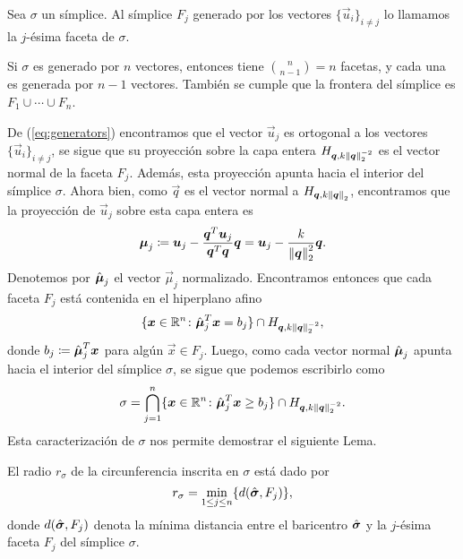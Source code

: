 \begin{definition}
	Sea $\sigma$ un símplice. Al símplice $F_j$ generado por los vectores $\lbrace \vec{u}_i
	\rbrace_{i \neq j}$ lo llamamos la $j$-ésima faceta de $\sigma$.
\end{definition}
\begin{observation}
	Si $\sigma$ es generado por $n$ vectores, entonces tiene $\binom{n}{n-1} = n$ facetas, y cada
	una es generada por $n - 1$ vectores. También se cumple que la frontera del símplice es $F_1
	\cup \cdots \cup F_n$.
\end{observation}

De (\ref{eq:generators}) encontramos que el vector $\vec{u}_j$ es ortogonal a los vectores $\lbrace
\vec{u}_i \rbrace_{i \neq j}$, se sigue que su proyección sobre la capa entera $H_{\boldsymbol{q},
k\left\lVert \boldsymbol{q} \right\rVert_2^{-2}}$ es el vector normal de la faceta $F_j$. Además, esta proyección apunta
hacia el interior del símplice $\sigma$. Ahora bien, como $\vec{q}$ es el vector normal a
$H_{\boldsymbol{q}, k\left\lVert \boldsymbol{q} \right\rVert_2}$, encontramos que la proyección de $\vec{u}_j$ sobre esta capa
entera es
\begin{equation}
	\label{eq:normal-vector}
	\boldsymbol{\mu}_j \coloneq
	\boldsymbol{u}_j - \frac{\boldsymbol{q}^T\boldsymbol{u}_j}{\boldsymbol{q}^T\boldsymbol{q}}\boldsymbol{q}
	=
	\boldsymbol{u}_j - \frac{k}{\left\lVert \boldsymbol{q} \right\rVert_2^2}\boldsymbol{q}.
\end{equation}
Denotemos por $\hat{\boldsymbol{ \mu }}_j$ el vector $\vec{\mu}_j$ normalizado. Encontramos entonces que cada
faceta $F_j$ está contenida en el hiperplano afino
\begin{equation*}
	\lbrace \boldsymbol{x} \in \mathbb{R}^{n} \colon \hat{\boldsymbol{ \mu }}_j^T\boldsymbol{x} = b_j \rbrace
	\cap H_{\boldsymbol{q}, k\left\lVert \boldsymbol{q} \right\rVert_2^{-2}},
\end{equation*}
donde $b_j \coloneq \hat{\boldsymbol{ \mu }}_j^T\boldsymbol{x}$ para algún $\vec{x} \in F_j$. Luego, como cada
vector normal $\hat{\boldsymbol{ \mu }}_j$ apunta hacia el interior del símplice $\sigma$, se sigue que
podemos escribirlo como
\begin{equation*}
	\sigma = \bigcap_{j=1}^{n} \lbrace \boldsymbol{x} \in \mathbb{R}^{n} \colon \hat{\boldsymbol{ \mu }}^T_j\boldsymbol{x} \geq b_j
	\rbrace \cap H_{\boldsymbol{q}, k\left\lVert \boldsymbol{q} \right\rVert_2^{-2}}.
\end{equation*}
Esta caracterización de $\sigma$ nos permite demostrar el siguiente Lema.
\begin{lemma}
	\label{lemma:sigma-radius}
	El radio $r_\sigma$ de la circunferencia inscrita en $\sigma$ está dado por
	\begin{equation*}
		r_\sigma = \min_{1 \leq j \leq n} \lbrace d(\hat{\boldsymbol{ \sigma }}, F_j) \rbrace,
	\end{equation*}
	donde $d(\hat{\boldsymbol{ \sigma }}, F_j)$ denota la mínima distancia entre el baricentro
	$\hat{\boldsymbol{ \sigma }}$ y la $j$-ésima faceta $F_j$ del símplice $\sigma$.
\end{lemma}
